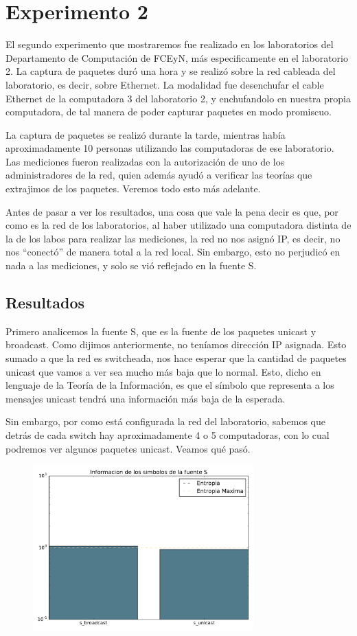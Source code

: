 \section{Experimento 2}

El segundo experimento que mostraremos fue realizado en los laboratorios del Departamento de Computación de FCEyN, más especificamente en el laboratorio 2.
La captura de paquetes duró una hora y se realizó sobre la red cableada del laboratorio, es decir, sobre Ethernet.
La modalidad fue desenchufar el cable Ethernet de la computadora 3 del laboratorio 2, y enchufandolo en nuestra propia computadora, de tal manera de poder capturar paquetes en modo promiscuo.

La captura de paquetes se realizó durante la tarde, mientras había aproximadamente 10 personas utilizando las computadoras de ese laboratorio. Las mediciones fueron realizadas con la autorización de uno de los administradores de la red, quien además ayudó a verificar las teorías que extrajimos de los paquetes. Veremos todo esto más adelante.

Antes de pasar a ver los resultados, una cosa que vale la pena decir es que, por como es la red de los laboratorios, al haber utilizado una computadora distinta de la de los labos para realizar las mediciones, la red no nos asignó IP, es decir, no nos ``conectó'' de manera total a la red local. Sin embargo, esto no perjudicó en nada a las mediciones, y solo se vió reflejado en la fuente S.


\subsection{Resultados}

Primero analicemos la fuente S, que es la fuente de los paquetes unicast y broadcast. Como dijimos anteriormente, no teníamos dirección IP asignada. Esto sumado a que la red es switcheada, nos hace esperar que la cantidad de paquetes unicast que vamos a ver sea mucho más baja que lo normal. Esto, dicho en lenguaje de la Teoría de la Información, es que el símbolo que representa a los mensajes unicast tendrá una información más baja de la esperada.

Sin embargo, por como está configurada la red del laboratorio, sabemos que detrás de cada switch hay aproximadamente 4 o 5 computadoras, con lo cual podremos ver algunos paquetes unicast. Veamos qu\'e pasó.

\begin{figure}[H]
  \centering
  \includegraphics[width=8.5cm]{exp_labo/grafico1.pdf}
  \caption{\normalfont }
\end{figure}


